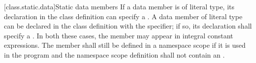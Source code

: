 \documentclass[american]{book}
\begin{document}
\begin{paras}
\setcounter{section}{4}
\setcounter{subsection}{1}
[class.static.data]{Static data members}
\setcounter{Paras}{2}
\pnum
If a  data member is of 
literal type, its declaration in the class definition
can specify a . A  data
member of
literal type can be declared in the class definition with the
 specifier; if so, its declaration shall specify a
.
In both these cases, the member may appear in
integral constant expressions. The member shall still be defined in a
namespace scope if it is used in the program and the namespace scope
definition shall not contain an .




\end{paras}
\end{document}
